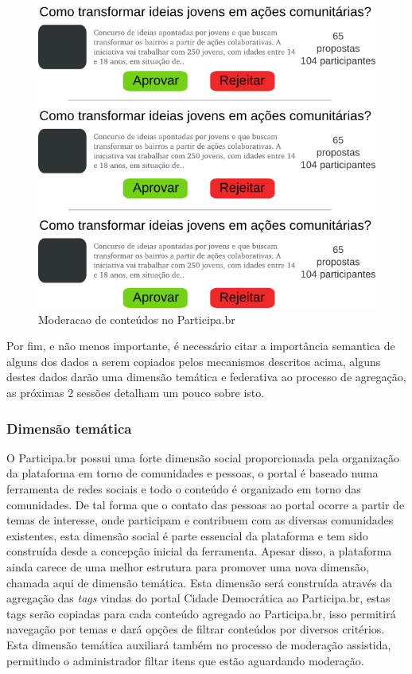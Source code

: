 \documentclass[12pt]{article}
\begin{document}
\begin{figure}[h!]
\center
\includegraphics[scale=0.6]{moderacao.png}
\caption{Moderacao de conteúdos no Participa.br}
\label{moderacao}
\end{figure}

Por fim, e não menos importante, é necessário citar a importância semantica de
alguns dos dados a serem copiados pelos mecanismos descritos acima, alguns
destes dados darão uma dimensão temática e federativa ao processo de
agregação, as próximas 2 sessões detalham um pouco sobre isto.

\subsubsection{Dimensão temática}

O Participa.br possui uma forte dimensão social proporcionada pela organização
da plataforma em torno de comunidades e pessoas, o portal é baseado numa
ferramenta de redes sociais e todo o conteúdo é organizado em torno das
comunidades. De tal forma que o contato das pessoas ao portal ocorre a partir
de temas de interesse, onde participam e contribuem com as diversas
comunidades existentes, esta dimensão social é parte essencial da plataforma e
tem sido construída desde a concepção inicial da ferramenta. Apesar disso, a
plataforma ainda carece de uma melhor estrutura para promover uma nova
dimensão, chamada aqui de dimensão temática.  Esta dimensão será construída
através da agregação das {\it tags} vindas do portal Cidade Democrática ao
Participa.br, estas tags serão copiadas para cada conteúdo agregado ao
Participa.br, isso permitirá navegação por temas e dará opções de filtrar
conteúdos por diversos critérios. Esta dimensão temática auxiliará também no
processo de moderação assistida, permitindo o administrador filtar itens
que estão aguardando moderação.
\end{document}
